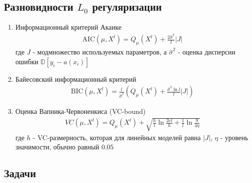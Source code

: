 \subsection{Разновидности $L_0$ регуляризации}

\begin{enumerate}
    \item Информационный критерий Акаике 
        \begin{align*}
            \text{AIC}(\mu, X^l) = Q_{\mu}(X^l) + \frac{2\hat{\sigma}^2}{l}|J|
        \end{align*}
        где $J$ - модмножество используемых параметров, а $\hat{\sigma}^2$ - оценка дисперсии ошибки $\mathbb{D}[y_i - a(x_i)]$ 
    \item Байесовский информационный критерий
        \begin{align*}
            \text{BIC}(\mu, X^l) = \frac{l}{\hat{\sigma}^2}\left(Q_{\mu}(X^l) + \frac{\hat{\sigma}^2\ln{l}}{l}|J|\right)
        \end{align*}
    \item Оценка Вапника-Червоненкиса (VC-bound)
        \begin{align*}
            VC(\mu, X^l) = Q_{\mu}(X^l) + \sqrt{\frac{h}{l}\ln{\frac{2el}{h}} + \frac{1}{l}\ln{\frac{9}{4\eta}}}
        \end{align*}
        где $h$ - VC-размерность, которая для линейных моделей равна $|J|$, $\eta$ - уровень значимости, обычно равный $0.05$
\end{enumerate}

\subsection{Задачи}

